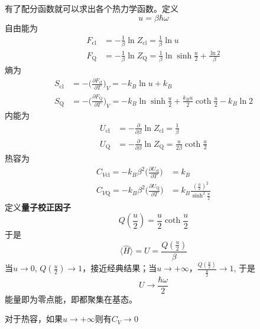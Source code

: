     有了配分函数就可以求出各个热力学函数。定义
    \[ u = \beta\hbar\omega \]
    自由能为
    \begin{equation}\begin{aligned}
        F_\mathrm{cl} &= -\frac 1{\beta} \ln{Z_\mathrm{cl}} = \frac 1{\beta} \ln{u}\\
        F_\mathrm{Q} &= -\frac 1{\beta} \ln{Z_\mathrm{Q}} = \frac 1{\beta}\ln{\sinh{\frac u2}}+ \frac {\ln{2}}{\beta}
    \end{aligned}\end{equation}
    熵为
    \begin{equation}\begin{aligned}
        S_\mathrm{cl} &= -\bigg(\frac {\partial F_{\mathrm{cl}}}{\partial T}\bigg)_V = -k_B \ln{u} + k_B\\
        S_\mathrm{Q} &= -\bigg(\frac {\partial F_{\mathrm{Q}}}{\partial T}\bigg)_V = -k_B \ln{\sinh{\frac u2}} + \frac {k_Bu}2 \coth{\frac u2} - k_B \ln{2}
    \end{aligned}\end{equation}
    内能为
    \begin{equation}\begin{aligned}
        U_\mathrm{cl} &= -\frac {\partial}{\partial \beta}\ln{Z_\mathrm{cl}} = \frac 1{\beta}\\
        U_\mathrm{Q} &= -\frac {\partial}{\partial \beta}\ln{Z_\mathrm{Q}} = \frac {u}{2\beta} \coth{\frac u2}
    \end{aligned}\end{equation}
    热容为
    \begin{equation}\begin{aligned}
        C_{V\mathrm{cl}} = -k_B \beta^2 \bigg(\frac {\partial U_\mathrm{cl}}{\partial T}) &= k_B\\
        C_{V\mathrm{Q}} = -k_B \beta^2 \bigg(\frac {\partial U_\mathrm{Q}}{\partial T}) &= k_B \frac {(\frac u2)^2}{\sinh^2{\frac u2}}
    \end{aligned}\end{equation}
    定义\textbf{量子校正因子}
    \[ Q(\frac u2) = \frac u2 \coth{\frac u2} \]
    于是 
    \[ \langle \hat{H} \rangle = U = \frac {Q(\frac u2)}{\beta} \]
    当$u \to 0$, $Q(\frac u2) \to 1$，接近经典结果；当$u \to +\infty$，$\frac {Q(\frac u2)}{\frac u2} \to 1$, 于是
    \[U \to \frac {\hbar \omega}2 \]
    能量即为零点能，即都聚集在基态。

    对于热容，如果$u \to +\infty$则有$C_V \to 0$

    
    

